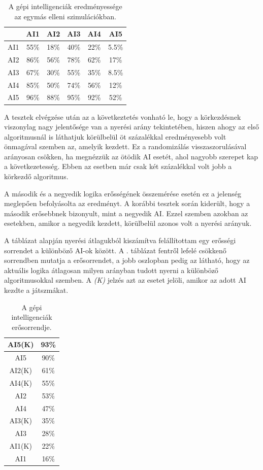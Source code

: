 \begin{table}[h]
\caption{A gépi intelligenciák eredményessége az egymás elleni szimulációkban.}
\label{tab:ai_comparison}
\medskip
\centering
\begin{tabular}{|c|c|c|c|c|c|} 
 \hline
  & AI1 & AI2 & AI3 & AI4 & AI5 \\ 
 \hline
 AI1 & 55\% & 18\% & 40\% & 22\% & 5.5\%\\ 
 \hline
 AI2 & 86\% & 56\% & 78\% & 62\% & 17\%\\ 
 \hline
 AI3 & 67\% & 30\% & 55\% & 35\% & 8.5\%\\ 
 \hline
 AI4 & 85\% & 50\% & 74\% & 56\% & 12\%\\ 
 \hline
 AI5 & 96\% & 88\% & 95\% & 92\% & 52\%\\
 \hline
\end{tabular}
\end{table}

A tesztek elvégzése után az a következtetés vonható le, hogy a körkezdésnek viszonylag nagy jelentősége van a nyerési arány tekintetében, hiszen ahogy az első algoritmusnál is láthatjuk körülbelül öt százalékkal eredményesebb volt önmagával szemben az, amelyik kezdett. Ez a randomizálás visszaszorulásával arányosan csökken, ha megnézzük az ötödik AI esetét, ahol nagyobb szerepet kap a következetesség. Ebben az esetben már csak két százalékkal volt jobb a körkezdő algoritmus.

A második és a negyedik logika erősségének összemérése esetén ez a jelenség meglepően befolyásolta az eredményt. A korábbi tesztek során kiderült, hogy a második erősebbnek bizonyult, mint a negyedik AI. Ezzel szemben azokban az esetekben, amikor a negyedik kezdett, körülbelül azonos volt a nyerési arányuk.

A táblázat alapján nyerési átlagukból kiszámítva felállítottam egy erősségi sorrendet a különböző AI-ok között. A . táblázat fentről lefelé csökkenő sorrendben mutatja a erősorrendet, a jobb oszlopban pedig az látható, hogy az aktuális logika átlagosan milyen arányban tudott nyerni a különböző algoritmusokkal szemben. A \textit{(K)} jelzés azt az esetet jelöli, amikor az adott AI kezdte a játszmákat.

\begin{table}[h]
\caption{A gépi intelligenciák erősorrendje.}
\label{tab:ai_ranking}
\medskip
\centering
\begin{tabular}{|c|c|} 
 \hline
 AI5(K) & 93\%\\ 
 \hline
 AI5 & 90\%\\ 
 \hline
 AI2(K) & 61\%\\ 
 \hline
 AI4(K) & 55\%\\ 
 \hline
 AI2 & 53\%\\
 \hline
  AI4 & 47\%\\ 
 \hline
 AI3(K) & 35\%\\ 
 \hline
 AI3 & 28\%\\ 
 \hline
 AI1(K) & 22\%\\ 
 \hline
 AI1 & 16\%\\
 \hline
\end{tabular}
\end{table}